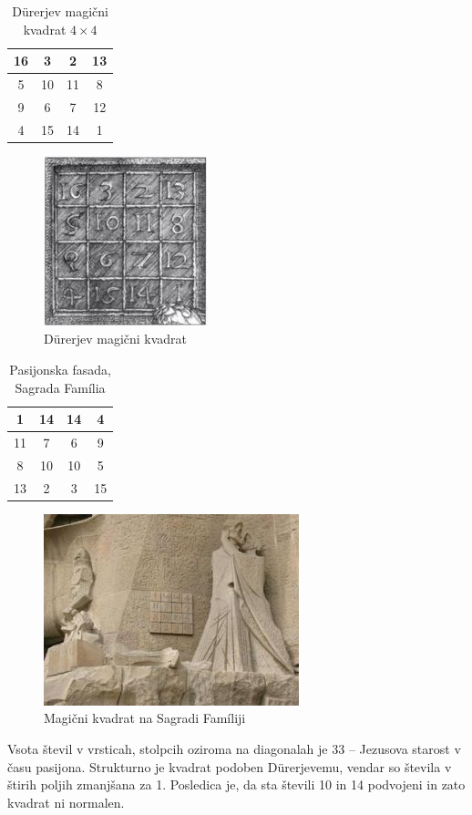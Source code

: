 \documentclass[a4paper,12pt]{article}
\theoremstyle{definition}
\theoremstyle{plain}
\newenvironment{magic}[3]{
   \begin{table}[!ht]%
   \centering%
   \caption{#2}%
   \label{#3}%
   \large
   \begin{tabular}{|*{#1}{c|}}%
      \hline
}{
   \end{tabular}%
   \end{table}%
}
\begin{document}
\begin{magic}{4}{Dürerjev magični kvadrat $4 \times 4$}{tab:Durer}
   16 &  3 &  2 & 13 \\\hline
    5 & 10 & 11 &  8 \\\hline
    9 &  6 &  7 & 12 \\\hline
    4 & 15 & 14 &  1 \\\hline
\end{magic}

\begin{figure}[!ht]
   \caption{Dürerjev magični kvadrat}
   \label{pic:Durer}
   \centering
   \includegraphics[scale=1.3]{durer.png}
\end{figure}

\begin{magic}{4}{Pasijonska fasada, Sagrada Família}{tab:Sagrada}
    1 & 14 & 14 &  4 \\\hline
   11 &  7 &  6 &  9 \\\hline
    8 & 10 & 10 &  5 \\\hline
   13 &  2 &  3 & 15 \\\hline
\end{magic}

\begin{figure}[!ht]
   \caption{Magični kvadrat na Sagradi Famíliji}
   \label{pic:Sagrada}
   \centering
   \includegraphics[scale=.45]{sagrada.png}
\end{figure}

Vsota števil v vrsticah, stolpcih oziroma na diagonalah je 33 -- Jezusova starost
v času pasijona. Strukturno je kvadrat podoben Dürerjevemu, vendar so števila
v štirih poljih zmanjšana za 1. Posledica je, da sta števili 10 in 14 podvojeni
in zato kvadrat ni normalen.
\end{document}
